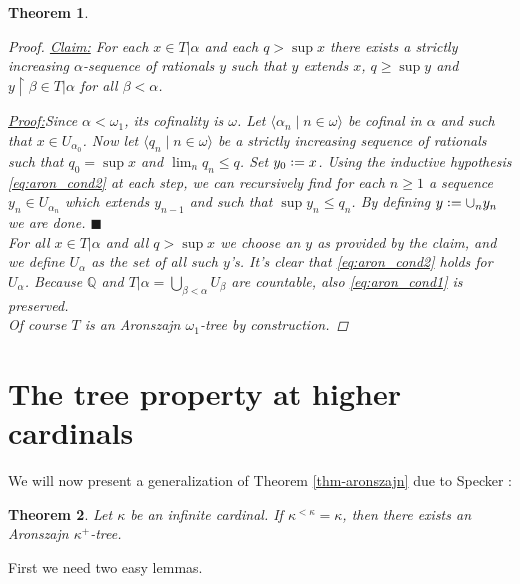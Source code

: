\documentclass[11pt,a4paper]{report}
\newtheorem{theorem}{Theorem}[chapter] %
\theoremstyle{definition}
\theoremstyle{num.custom-title}
\theoremstyle{custom-title}
\newenvironment{claim}[1]{\par\noindent\underline{Claim#1:}\space}{} %
\newenvironment{claimproof}[1]{\par\noindent\underline{Proof:}\space#1}{\leavevmode\unskip\penalty9999 \hbox{}\nobreak\hfill\quad\hbox{$\blacksquare$}} %
\DeclareMathOperator{\restr}{\upharpoonright}
\newcommand{\Q}{\mathbb{Q}}
\newcommand*{\defeq}{\mathrel{\rlap{%
                     \raisebox{0.3ex}{$\cdot$}}%
                     \raisebox{-0.3ex}{$\cdot$}}%
                     =}
\begin{document}
\begin{theorem}
\begin{proof}
\begin{claim}{}
For each $x \in T|\alpha$ and each $q > \sup x$ there exists a strictly increasing $\alpha$-sequence of rationals $y$ such that $y$ extends $x$, $q \geq \sup y$ and $y \restr \beta \in T|\alpha$ for all $\beta<\alpha$.
\begin{claimproof}
Since $\alpha < \omega_1$, its cofinality is $\omega$. Let $\langle \alpha_n \mid n \in \omega \rangle$ be cofinal in $\alpha$ and such that $x \in U_{\alpha_0}$. Now let $\langle q_n \mid n \in \omega \rangle$ be a strictly increasing sequence of rationals such that $q_0 = \sup x$ and $\lim_n q_n \leq q$. Set $y_0 \defeq x$. Using the inductive hypothesis \eqref{eq:aron_cond2} at each step, we can recursively find for each $n \geq 1$ a sequence $y_n \in U_{\alpha_n}$ which extends $y_{n-1}$ and such that $\sup y_n \leq q_n$. By defining $y \defeq \cup_n y_n$ we are done.
\end{claimproof}
\end{claim}\\[6pt]
For all $x \in T|\alpha$ and all $q > \sup x$ we choose an $y$ as provided by the claim, and we define $U_\alpha$ as the set of all such $y$'s. It's clear that \eqref{eq:aron_cond2} holds for $U_\alpha$. Because $\Q$ and $T|\alpha = \bigcup_{\beta < \alpha} U_\beta$ are countable, also \eqref{eq:aron_cond1} is preserved.\\
Of course $T$ is an Aronszajn $\omega_1$-tree by construction.
\end{proof}
\end{theorem}

\section{The tree property at higher cardinals}

We will now present a generalization of Theorem \ref{thm-aronszajn} due to Specker \cite{Spe1949}:

\begin{theorem}\label{thm-aronszajn_k+_tree}
Let $\kappa$ be an infinite cardinal. If $\kappa^{<\kappa}=\kappa$, then there exists an Aronszajn $\kappa^+$-tree.
\end{theorem}

First we need two easy lemmas.
\end{document}
